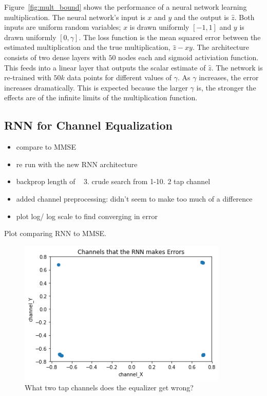 Figure~\ref{fig:mult_bound} shows the performance of a neural network learning multiplication.
The neural network's input is $x$ and $y$ and the output is $\hat{z}$.  Both inputs are uniform random variables; $x$ is drawn uniformly $[-1,1]$ and $y$ is drawn uniformly $[0,\gamma]$. 
The loss function is the mean squared error between the estimated multiplication and the true multiplication, $\hat{z}-xy$.
The architecture consists of two dense layers with $50$ nodes each and sigmoid activiation function.  This feeds into a linear layer that outputs the scalar estimate of $\hat{z}$.  
The network is re-trained with $50k$ data points for different values of $\gamma$. As $\gamma$ increases, the error increases dramatically.  This is expected because the larger $\gamma$ is, the stronger the effects are of the infinite limits of the multiplication function.


\subsection{RNN for Channel Equalization}

\begin{itemize}
\item compare to MMSE
\item re run with the new RNN architecture
\item backprop length of ~ 3. crude search from 1-10. 2 tap channel
\item added channel preprocessing: didn't seem to make too much of a difference
\item plot log/ log scale to find converging in error
\end{itemize}

Plot comparing RNN to MMSE.

\begin{figure}
\begin{center}
\includegraphics[width=100mm]{figures/equal/incorrect_channels.png}
\caption{What two tap channels does the equalizer get wrong?}
\label{fig:incorr_chan}
\end{center}
\end{figure}

